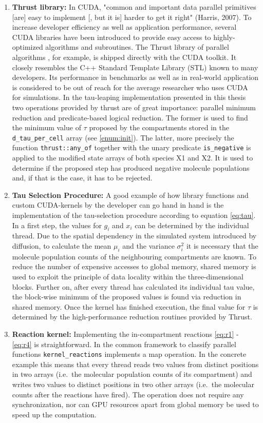 \begin{enumerate}
\item \textbf{Thrust library:} In CUDA, "common and important data parallel primitives [are] easy to implement [, but it is] harder to get it right" (Harris, 2007). To increase developer efficiency as well as application performance, several CUDA libraries have been introduced to provide easy access to highly-optimized algorithms and subroutines. The Thrust library of parallel algorithms \cite{hoberock_thrust:_2010}, for example, is shipped directly with the CUDA toolkit. It closely resembles the C++ Standard Template Library (STL) known to many developers. Its performance in benchmarks as well as in real-world application is considered to be out of reach for the average researcher who uses CUDA for simulations. In the tau-leaping implementation presented in this thesis two operations provided by thrust are of great importance: parallel minimum reduction and predicate-based logical reduction. The former is used to find the minimum value of $\tau$ proposed by the compartments stored in the \texttt{d\_tau\_per\_cell} array (see \ref{enum:init}). The latter, more precisely the function \texttt{thrust::any\_of} together with the unary predicate \texttt{is\_negative} is applied to the modified state arrays of both species X1 and X2. It is used to determine if the proposed step has produced negative molecule populations and, if that is the case, it has to be rejected. 

\item \textbf{Tau Selection Procedure:} \label{enum:4}
A good example of how library functions and custom CUDA-kernels by the developer can go hand in hand is the implementation of the tau-selection procedure according to equation \ref{eq:tau}. In a first step, the values for $g_i$ and $x_i$ can be determined by the individual thread. Due to the spatial dependency in the simulated system introduced by diffusion, to calculate the mean $\mu_i$ and the variance $\sigma_i^2$ it is necessary that the molecule population counts of the neighbouring compartments are known. To reduce the number of expensive accesses to global memory, shared memory is used to exploit the principle of data locality within the three-dimensional blocks. Further on, after every thread has calculated its individual tau value, the block-wise minimum of the proposed values is found via reduction in shared memory. Once the kernel has finished execution, the final value for $\tau$ is determined by the high-performance reduction routines provided by Thrust. 

\item \textbf{Reaction kernel:} Implementing the in-compartment reactions \eqref{eq:r1} - \eqref{eq:r4} is straightforward. In the common framework to classify parallel functions \texttt{kernel\_reactions} implements a map operation. In the concrete example this means that every thread reads two values from distinct positions in two arrays (i.e.\ the molecular population counts of its compartment) and writes two values to distinct positions in two other arrays (i.e.\ the molecular counts after the reactions have fired). The operation does not require any synchronization, nor can GPU resources apart from global memory be used to speed up the computation. 


\end{enumerate}
